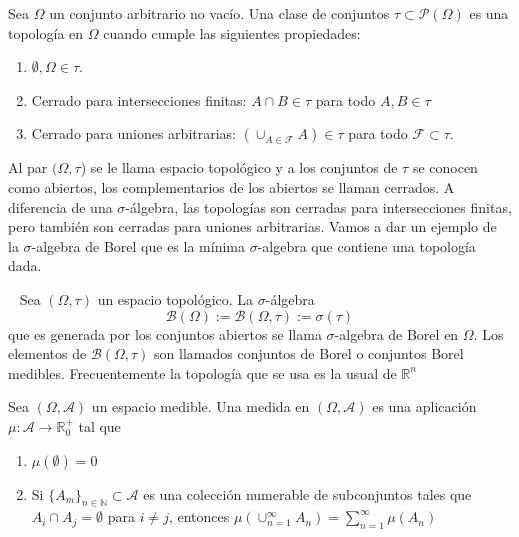     \begin{definicion}[Topología]
        Sea $\Omega$ un conjunto arbitrario no vacío. Una clase de conjuntos $\tau \subset \mathcal{P}(\Omega)$ es una topología en $\Omega$ cuando cumple las siguientes propiedades:
        \begin{enumerate}
            \item $\emptyset , \Omega \in \tau$.
            \item Cerrado para intersecciones finitas: $A \cap B \in \tau$ para todo $A,B \in \tau$ 
            \item Cerrado para uniones arbitrarias: $(\cup_{A \in \mathcal{F}}A) \in \tau$ para todo $\mathcal{F} \subset \tau$.
        \end{enumerate}
    \end{definicion}
    
    Al par $(\Omega,\tau$) se le llama espacio topológico y a los conjuntos de $\tau$ se conocen como abiertos, los complementarios de los abiertos se llaman cerrados. A diferencia de una $\sigma$-álgebra, las topologías son cerradas para intersecciones finitas, pero también son cerradas para uniones arbitrarias. Vamos a dar un ejemplo de la $\sigma$-algebra de Borel que es la mínima $\sigma$-algebra que contiene una topología dada.
    
        \begin{ejemplo}~\smallskip
           Sea $(\Omega, \tau)$ un espacio topológico. La $\sigma$-álgebra $$\mathcal{B}(\Omega) := \mathcal{B}(\Omega,\tau):=\sigma(\tau)$$ que es generada por los conjuntos abiertos se llama $\sigma$-algebra de Borel en $\Omega$. Los elementos de $\mathcal{B}(\Omega,\tau)$ son llamados conjuntos de Borel o conjuntos Borel medibles. Frecuentemente la topología que se usa es la usual de $\mathbb{R}^n$
        \end{ejemplo}   
    
    
    
    \begin{definicion}[Medida]\label{def:medida}
          Sea $(\Omega,\mathcal{A})$ un espacio medible. Una medida en $(\Omega,\mathcal{A})$ es una aplicación $\mu: \mathcal{A} \rightarrow \mathbb{R}_0^+$ tal que
                  
          \begin{enumerate}
             \item $\mu(\emptyset) = 0$
             \item Si $\{A_m\}_{n\in\mathbb{N}} \subset \mathcal{A}$ es una colección numerable de subconjuntos tales que ${A_i \cap A_j = \emptyset}$ para $i\not=j$, entonces $\mu(\cup^{\infty}_{n=1}A_n) = \sum^{\infty}_{n=1} \mu(A_n)$
          \end{enumerate}
     \end{definicion}
     
